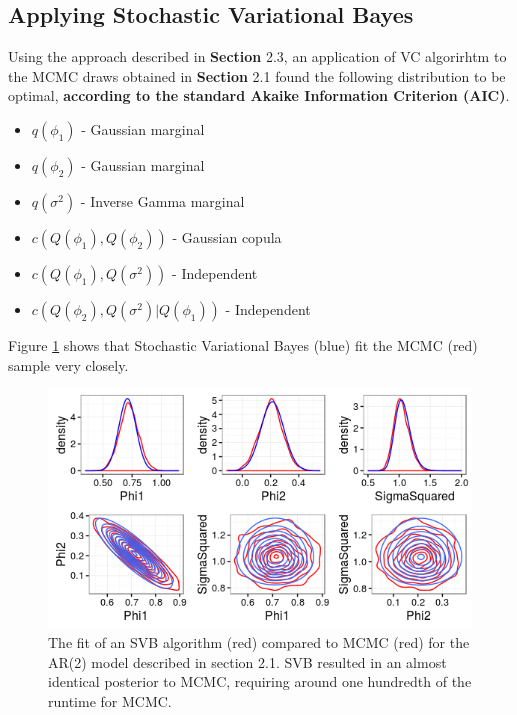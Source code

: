 \documentclass[12pt,a4paper]{article}%
\numberwithin{equation}{section}
\begin{document}
\subsection{Applying Stochastic Variational Bayes}

Using the approach described in {\bf Section} 2.3,
an application of VC algorirhtm to the MCMC draws obtained in {\bf Section} 2.1 %
found the following distribution to be optimal, {\bf according to the standard Akaike Information Criterion (AIC)}.

\begin{itemize}
\item $q(\phi_1)$ - Gaussian marginal
\item $q(\phi_2)$ - Gaussian marginal
\item $q(\sigma^2)$ - Inverse Gamma marginal
\item $c(Q(\phi_1), Q(\phi_2))$ - Gaussian copula
\item $c(Q(\phi_1), Q(\sigma^2))$ - Independent
\item $c(Q(\phi_2), Q(\sigma^2) | Q(\phi_1))$ - Independent
\end{itemize}

Figure \ref{VBfit} shows that Stochastic Variational Bayes (blue) fit the MCMC (red) sample very closely.

\begin{figure}[h]
\centering
\includegraphics[scale = 0.6]{VBfit.png}
\caption{The fit of an SVB algorithm (red) compared to MCMC (red) for the AR(2) model described in section 2.1. SVB resulted in an almost identical posterior to MCMC, requiring around one hundredth of the runtime for MCMC.}
\label{VBfit}
\end{figure}
\end{document}
